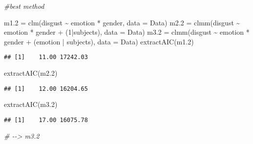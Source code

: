\documentclass[
]{article}
\newenvironment{Shaded}{\begin{snugshade}}{\end{snugshade}}
\newcommand{\AttributeTok}[1]{\textcolor[rgb]{0.77,0.63,0.00}{#1}}
\newcommand{\CommentTok}[1]{\textcolor[rgb]{0.56,0.35,0.01}{\textit{#1}}}
\newcommand{\DecValTok}[1]{\textcolor[rgb]{0.00,0.00,0.81}{#1}}
\newcommand{\FloatTok}[1]{\textcolor[rgb]{0.00,0.00,0.81}{#1}}
\newcommand{\FunctionTok}[1]{\textcolor[rgb]{0.00,0.00,0.00}{#1}}
\newcommand{\NormalTok}[1]{#1}
\newcommand{\OtherTok}[1]{\textcolor[rgb]{0.56,0.35,0.01}{#1}}
\newcommand{\SpecialCharTok}[1]{\textcolor[rgb]{0.00,0.00,0.00}{#1}}
\begin{document}
\begin{Shaded}
\begin{Highlighting}[]
\CommentTok{\#best method}

\NormalTok{m1}\FloatTok{.2} \OtherTok{=} \FunctionTok{clm}\NormalTok{(disgust }\SpecialCharTok{\textasciitilde{}}\NormalTok{ emotion }\SpecialCharTok{*}\NormalTok{ gender, }\AttributeTok{data =}\NormalTok{ Data)}
\NormalTok{m2}\FloatTok{.2} \OtherTok{=} \FunctionTok{clmm}\NormalTok{(disgust }\SpecialCharTok{\textasciitilde{}}\NormalTok{ emotion }\SpecialCharTok{*}\NormalTok{ gender }\SpecialCharTok{+}\NormalTok{ (}\DecValTok{1}\SpecialCharTok{|}\NormalTok{subjects), }\AttributeTok{data =}\NormalTok{ Data)}
\NormalTok{m3}\FloatTok{.2} \OtherTok{=} \FunctionTok{clmm}\NormalTok{(disgust }\SpecialCharTok{\textasciitilde{}}\NormalTok{ emotion }\SpecialCharTok{*}\NormalTok{ gender }\SpecialCharTok{+}\NormalTok{ (emotion }\SpecialCharTok{|}\NormalTok{ subjects), }\AttributeTok{data =}\NormalTok{ Data)}
\FunctionTok{extractAIC}\NormalTok{(m1}\FloatTok{.2}\NormalTok{)}
\end{Highlighting}
\end{Shaded}

\begin{verbatim}
## [1]    11.00 17242.03
\end{verbatim}

\begin{Shaded}
\begin{Highlighting}[]
\FunctionTok{extractAIC}\NormalTok{(m2}\FloatTok{.2}\NormalTok{)}
\end{Highlighting}
\end{Shaded}

\begin{verbatim}
## [1]    12.00 16204.65
\end{verbatim}

\begin{Shaded}
\begin{Highlighting}[]
\FunctionTok{extractAIC}\NormalTok{(m3}\FloatTok{.2}\NormalTok{)}
\end{Highlighting}
\end{Shaded}

\begin{verbatim}
## [1]    17.00 16075.78
\end{verbatim}

\begin{Shaded}
\begin{Highlighting}[]
\CommentTok{\# {-}{-}\textgreater{} m3.2}
\end{Highlighting}
\end{Shaded}
\end{document}
